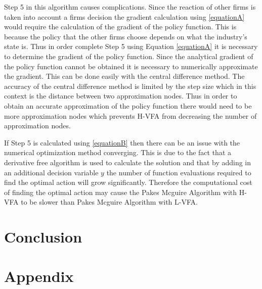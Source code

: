 \documentclass[12pt]{article}
\begin{document}
Step 5 in this algorithm causes complications. Since the reaction of other firms is taken into account a firms decision the gradient calculation using \eqref{equationA} would require the calculation of the gradient of the policy function. This is because the policy that the other firms choose depends on what the industry's state is. Thus in order complete Step 5 using Equation \eqref{equationA} it is necessary to determine the gradient of the policy function. Since the analytical gradient of the policy function cannot be obtained it is necessary to numerically approximate the gradient. This can be done easily with the central difference method. The accuracy of the central difference method is limited by the step size which in this context is the distance between two approximation nodes. Thus in order to obtain an accurate approximation of the policy function there would need to be more approximation nodes which prevents H-VFA from decreasing the number of approximation nodes.

If Step 5 is calculated using \eqref{equationB} then there can be an issue with the numerical optimization method converging. This is due to the fact that a derivative free algorithm is used to calculate the solution and that by adding in an additional decision variable $y$ the number of function evaluations required to find the optimal action will grow significantly. Therefore the computational cost of finding the optimal action may cause the Pakes Mcguire Algorithm with H-VFA to be slower than Pakes Mcguire Algorithm with L-VFA.




\section{Conclusion}
\label{con}


{}

\section*{Appendix}
\end{document}
